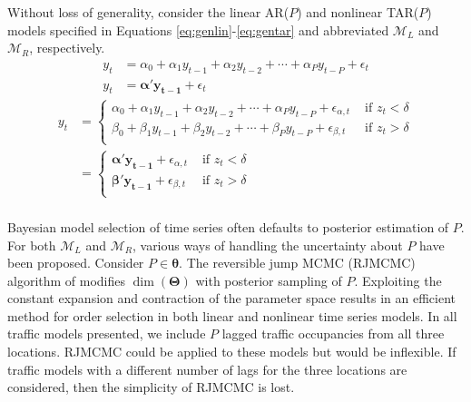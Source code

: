 Without loss of generality, consider the linear AR($P$) and nonlinear TAR($P$) models specified in Equations \ref{eq:genlin}-\ref{eq:gentar} and abbreviated $\mathcal{M}_L$ and $\mathcal{M}_R$, respectively.
\begin{equation}
\label{eq:genlin}
\begin{split}
y_t&=\alpha_0+\alpha_1y_{t-1}+\alpha_2y_{t-2}+\cdots+\alpha_Py_{t-P}+\epsilon_t \\
y_t&=\bm{\alpha}'\bm{y_{t-1}}+\epsilon_t 
\end{split}
\end{equation}
\begin{equation}
\label{eq:gentar}
\begin{split}
y_t&=
  \begin{cases}
    \alpha_0+\alpha_1y_{t-1}+\alpha_2y_{t-2}+\cdots+\alpha_Py_{t-P}+\epsilon_{\alpha,t} & \textrm{ if } z_t<\delta \\
    \beta_0+\beta_1y_{t-1}+\beta_2y_{t-2}+\cdots+\beta_Py_{t-P}+\epsilon_{\beta,t} & \textrm{ if } z_t>\delta \\
  \end{cases}\\
  &=
    \begin{cases}
    \bm{\alpha}'\bm{y_{t-1}} +\epsilon_{\alpha,t} & \textrm{ if } z_t<\delta \\
     \bm{\beta}'\bm{y_{t-1}} +\epsilon_{\beta,t} & \textrm{ if } z_t>\delta \\
  \end{cases}\\
  \end{split}
\end{equation}

Bayesian model selection of time series often defaults to posterior estimation of $P$. For both $\mathcal{M}_L$ and $\mathcal{M}_R$, various ways of handling the uncertainty about $P$ have been proposed. Consider $P \in \bm{\theta}$. The reversible jump MCMC (RJMCMC) algorithm of \cite{Green1995} modifies $\dim(\bm{\Theta})$ with posterior sampling of $P$. Exploiting the constant expansion and contraction of the parameter space results in an efficient method for order selection in both linear \citep{Troughton1997,Vermaak2004} and nonlinear \citep{Campbell2004,Lopes2006} time series models. In all traffic models presented, we include $P$ lagged traffic occupancies from all three locations. RJMCMC could be applied to these models but would be inflexible. If traffic models with a different number of lags for the three locations are considered, then the simplicity of RJMCMC is lost. 

